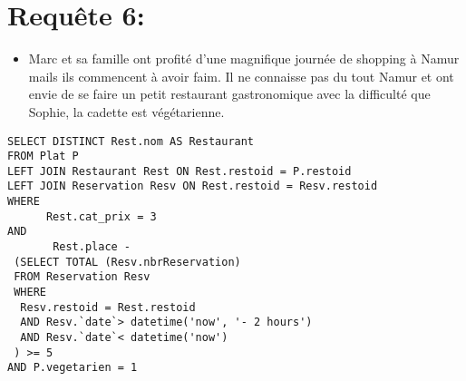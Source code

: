 \documentclass[a4paper, 12pt]{article}
\begin{document}
\section*{Requête 6:}

\begin{itemize}
\item Marc et sa famille ont profité d'une magnifique journée de shopping à Namur mails ils commencent à avoir faim. Il ne connaisse pas du tout Namur et ont envie de se faire un petit restaurant gastronomique avec la difficulté que Sophie, la cadette est végétarienne.
\end{itemize}

\begin{lstlisting} 
SELECT DISTINCT Rest.nom AS Restaurant
FROM Plat P
LEFT JOIN Restaurant Rest ON Rest.restoid = P.restoid
LEFT JOIN Reservation Resv ON Rest.restoid = Resv.restoid
WHERE 
      Rest.cat_prix = 3
AND 
       Rest.place -
 (SELECT TOTAL (Resv.nbrReservation)
 FROM Reservation Resv
 WHERE 
  Resv.restoid = Rest.restoid
  AND Resv.`date`> datetime('now', '- 2 hours')
  AND Resv.`date`< datetime('now') 
 ) >= 5
AND P.vegetarien = 1
\end{lstlisting}
\end{document}
